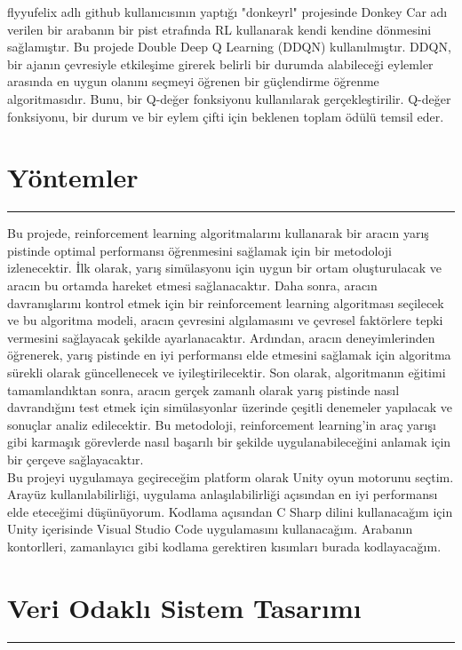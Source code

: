 \documentclass{article}
\begin{document}
\newpage

\noindent
flyyufelix adlı github kullanıcısının yaptığı "donkeyrl" projesinde Donkey Car adı verilen bir arabanın bir pist etrafında RL kullanarak kendi kendine dönmesini sağlamıştır. Bu projede Double Deep Q Learning (DDQN) kullanılmıştır. DDQN, bir ajanın çevresiyle etkileşime girerek belirli bir durumda alabileceği eylemler arasında en uygun olanını seçmeyi öğrenen bir güçlendirme öğrenme algoritmasıdır. Bunu, bir Q-değer fonksiyonu kullanılarak gerçekleştirilir. Q-değer fonksiyonu, bir durum ve bir eylem çifti için beklenen toplam ödülü temsil eder.\\[15pt]

\section{Yöntemler}
\rule{\textwidth}{0.5pt}
Bu projede, reinforcement learning algoritmalarını kullanarak bir aracın yarış pistinde optimal performansı öğrenmesini sağlamak için bir metodoloji izlenecektir. İlk olarak, yarış simülasyonu için uygun bir ortam oluşturulacak ve aracın bu ortamda hareket etmesi sağlanacaktır. Daha sonra, aracın davranışlarını kontrol etmek için bir reinforcement learning algoritması seçilecek ve bu algoritma modeli, aracın çevresini algılamasını ve çevresel faktörlere tepki vermesini sağlayacak şekilde ayarlanacaktır. Ardından, aracın deneyimlerinden öğrenerek, yarış pistinde en iyi performansı elde etmesini sağlamak için algoritma sürekli olarak güncellenecek ve iyileştirilecektir. Son olarak, algoritmanın eğitimi tamamlandıktan sonra, aracın gerçek zamanlı olarak yarış pistinde nasıl davrandığını test etmek için simülasyonlar üzerinde çeşitli denemeler yapılacak ve sonuçlar analiz edilecektir. Bu metodoloji, reinforcement learning'in araç yarışı gibi karmaşık görevlerde nasıl başarılı bir şekilde uygulanabileceğini anlamak için bir çerçeve sağlayacaktır.\\[5pt]
\newline
Bu projeyi uygulamaya geçireceğim platform olarak Unity oyun motorunu seçtim. Arayüz kullanılabilirliği, uygulama anlaşılabilirliği açısından en iyi performansı elde eteceğimi düşünüyorum. Kodlama açısından C Sharp dilini kullanacağım için Unity içerisinde Visual Studio Code uygulamasını kullanacağım. Arabanın kontorlleri, zamanlayıcı gibi kodlama gerektiren kısımları burada kodlayacağım.\\[15pt]

\newpage

\section{Veri Odaklı Sistem Tasarımı}
\rule{\textwidth}{0.5pt}
\end{document}
